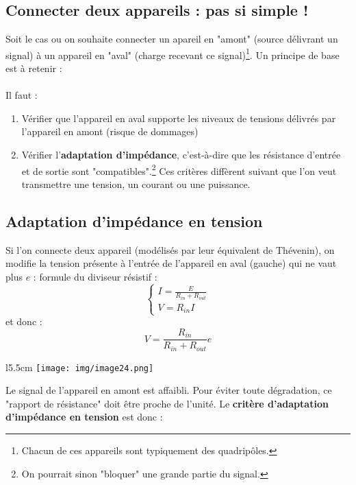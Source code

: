 \documentclass[11pt, a4paper, openany]{book}
\begin{document}
		\subsection{Connecter deux appareils : pas si simple !}
		Soit le cas ou on souhaite connecter un apareil en "amont" (source délivrant un signal) à un appareil en "aval" (charge recevant ce signal)\footnote{Chacun de ces appareils sont typiquement des quadripôles.}. Un principe de base est à retenir :\\
		\ \\
		
		Il faut :
		\begin{enumerate}
			\item Vérifier que l'appareil en aval supporte les niveaux de tensions délivrés par l'appareil en amont (risque de dommages)
			\item Vérifier l'\textbf{adaptation d'impédance}, c'est-à-dire que les résistance d'entrée et de sortie sont "compatibles".\footnote{On pourrait sinon "bloquer" une grande partie du signal.} Ces critères diffèrent suivant que l'on veut transmettre une tension, un courant ou une puissance.
		\end{enumerate}
		
		\subsection{Adaptation d'impédance en tension}
		Si l'on connecte deux appareil (modélisés par leur équivalent de Thévenin), on modifie la tension présente à l'entrée de l'appareil en aval (gauche) qui ne vaut plus $e$ : formule du diviseur résistif :
		\begin{equation}
		\left\{\begin{array}{l}
		I = \frac{E}{R_{in} + R_{out}}\\
		V = R_{in} I
		\end{array}\right.
		\end{equation}
		et donc : 
		\begin{equation}
		V = \frac{R_{in}}{R_{in} + R_{out}}e
		\end{equation}
		\begin{wrapfigure}[5]{l}{5.5cm}
			\texttt{[image: img/image24.png]}
		\end{wrapfigure}
		Le signal de l'appareil en amont est affaibli. Pour éviter toute dégradation, ce "rapport de résistance" doit être proche de l'unité. Le \textbf{critère d'adaptation d'impédance en tension} est donc :\\
		
\end{document}

